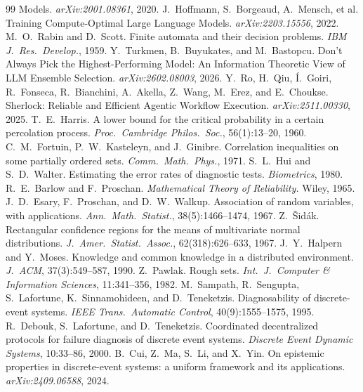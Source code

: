 \documentclass[11pt]{article}
\theoremstyle{definition}
\theoremstyle{remark}
\begin{document}
\begin{thebibliography}{99}
Models. \emph{arXiv:2001.08361}, 2020.
 J.~Hoffmann, S.~Borgeaud, A.~Mensch, et al. Training Compute-Optimal Large
Language Models. \emph{arXiv:2203.15556}, 2022.
 M.~O.~Rabin and D.~Scott. Finite automata and their decision problems.
\emph{IBM J.\ Res.\ Develop.}, 1959.
 Y.~Turkmen, B.~Buyukates, and M.~Bastopcu. Don't Always Pick the
Highest-Performing Model: An Information Theoretic View of LLM Ensemble Selection.
\emph{arXiv:2602.08003}, 2026.
 Y.~Ro, H.~Qiu, \'I.~Goiri, R.~Fonseca, R.~Bianchini, A.~Akella, Z.~Wang,
M.~Erez, and E.~Choukse. Sherlock: Reliable and Efficient Agentic Workflow Execution.
\emph{arXiv:2511.00330}, 2025.
 T.~E.~Harris. A lower bound for the critical probability in a certain
percolation process. \emph{Proc.\ Cambridge Philos.\ Soc.}, 56(1):13--20, 1960.
 C.~M.~Fortuin, P.~W.~Kasteleyn, and J.~Ginibre. Correlation inequalities on some
partially ordered sets. \emph{Comm.\ Math.\ Phys.}, 1971.
 S.~L.~Hui and S.~D.~Walter. Estimating the error rates of diagnostic tests.
\emph{Biometrics}, 1980.
 R.~E.~Barlow and F.~Proschan. \emph{Mathematical Theory of Reliability.}
Wiley, 1965.
 J.~D.~Esary, F.~Proschan, and D.~W.~Walkup. Association of random variables, with
applications. \emph{Ann.\ Math.\ Statist.}, 38(5):1466--1474, 1967.
 Z.~\v{S}id\'ak. Rectangular confidence regions for the means of multivariate
normal distributions. \emph{J.~Amer.\ Statist.\ Assoc.}, 62(318):626--633, 1967.
 J.~Y.~Halpern and Y.~Moses. Knowledge and common knowledge in a distributed
environment. \emph{J.~ACM}, 37(3):549--587, 1990.
 Z.~Pawlak. Rough sets. \emph{Int.\ J.\ Computer \& Information Sciences},
11:341--356, 1982.
 M.~Sampath, R.~Sengupta, S.~Lafortune, K.~Sinnamohideen, and D.~Teneketzis.
Diagnosability of discrete-event systems. \emph{IEEE Trans.\ Automatic Control}, 40(9):1555--1575, 1995.
 R.~Debouk, S.~Lafortune, and D.~Teneketzis. Coordinated decentralized protocols
for failure diagnosis of discrete event systems. \emph{Discrete Event Dynamic Systems}, 10:33--86, 2000.
 B.~Cui, Z.~Ma, S.~Li, and X.~Yin. On epistemic properties in discrete-event
systems: a uniform framework and its applications. \emph{arXiv:2409.06588}, 2024.

\end{thebibliography}
\end{document}
